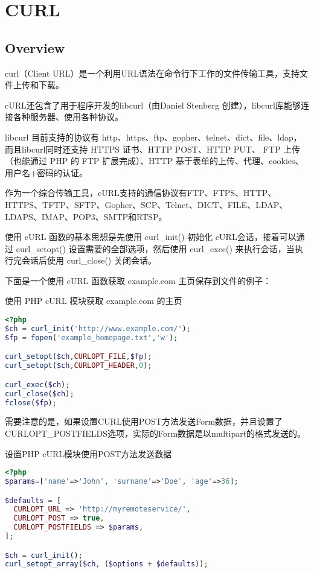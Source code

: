 \part{CURL}


\chapter{Overview}

curl（Client URL）是一个利用URL语法在命令行下工作的文件传输工具，支持文件上传和下载。

cURL还包含了用于程序开发的libcurl（由Daniel Stenberg 创建），libcurl库能够连接各种服务器、使用各种协议。

libcurl 目前支持的协议有 http、https、ftp、gopher、telnet、dict、file、ldap，而且libcurl同时还支持 HTTPS 证书、HTTP POST、HTTP PUT、 FTP 上传（也能通过 PHP 的 FTP 扩展完成）、HTTP 基于表单的上传、代理、cookies、用户名+密码的认证。

作为一个综合传输工具，cURL支持的通信协议有FTP、FTPS、HTTP、HTTPS、TFTP、SFTP、Gopher、SCP、Telnet、DICT、FILE、LDAP、LDAPS、IMAP、POP3、SMTP和RTSP。


使用 cURL 函数的基本思想是先使用 curl\_init() 初始化 cURL会话，接着可以通过 curl\_setopt() 设置需要的全部选项，然后使用 curl\_exec() 来执行会话，当执行完会话后使用 curl\_close() 关闭会话。

下面是一个使用 cURL 函数获取 example.com 主页保存到文件的例子：

\begin{example}
使用 PHP cURL 模块获取 example.com 的主页
\begin{lstlisting}[language=PHP]
<?php
$ch = curl_init('http://www.example.com/');
$fp = fopen('example_homepage.txt','w');

curl_setopt($ch,CURLOPT_FILE,$fp);
curl_setopt($ch,CURLOPT_HEADER,0);

curl_exec($ch);
curl_close($ch);
fclose($fp);
\end{lstlisting}
\end{example}

需要注意的是，如果设置CURL使用POST方法发送Form数据，并且设置了CURLOPT\_POSTFIELDS选项，实际的Form数据是以multipart的格式发送的。


\begin{example}
设置PHP cURL模块使用POST方法发送数据
\begin{lstlisting}[language=PHP]
<?php
$params=['name'=>'John', 'surname'=>'Doe', 'age'=>36];

$defaults = [
  CURLOPT_URL => 'http://myremoteservice/', 
  CURLOPT_POST => true,
  CURLOPT_POSTFIELDS => $params,
];

$ch = curl_init();
curl_setopt_array($ch, ($options + $defaults));
\end{lstlisting}
\end{example}

